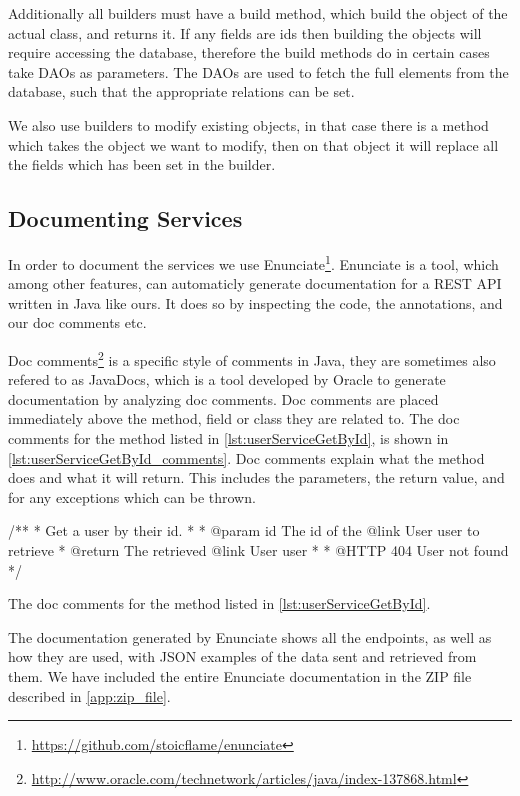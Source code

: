 Additionally all builders must have a build method, which build the object of the actual class, and returns it.
If any fields are ids then building the objects will require accessing the database,
therefore the build methods do in certain cases take \acp{DAO} as parameters.
The \acp{DAO} are used to fetch the full elements from the database,
such that the appropriate relations can be set.

We also use builders to modify existing objects,
in that case there is a method which takes the object we want to modify,
then on that object it will replace all the fields which has been set in the builder.

\subsection{Documenting Services}\label{documenting_services}
In order to document the services we use Enunciate\footnote{\url{https://github.com/stoicflame/enunciate}}.
Enunciate is a tool, which among other features, can automaticly generate documentation for a REST API written in Java like ours.
It does so by inspecting the code, the annotations, and our doc comments etc.

Doc comments\footnote{\url{http://www.oracle.com/technetwork/articles/java/index-137868.html}} is a specific style of comments in Java, they are sometimes also refered to as JavaDocs, which is a tool developed by Oracle to generate documentation by analyzing doc comments.
Doc comments are placed immediately above the method, field or class they are related to.
The doc comments for the method listed in \cref{lst:userServiceGetById}, is shown in \cref{lst:userServiceGetById_comments}.
Doc comments explain what the method does and what it will return.
This includes the parameters, the return value, and for any exceptions which can be thrown.

\begin{listing}
    \begin{java2}
/**
 * Get a user by their id.
 *
 * @param id The id of the {@link User user} to retrieve
 * @return The retrieved {@link User user}
 *
 * @HTTP 404 User not found
 */
    \end{java2}
    \caption{The doc comments for the method listed in \cref{lst:userServiceGetById}.}\label{lst:userServiceGetById_comments}
\end{listing}

The documentation generated by Enunciate shows all the endpoints, as well as how they are used,
with JSON examples of the data sent and retrieved from them.
We have included the entire Enunciate documentation in the ZIP file described in \cref{app:zip_file}.

